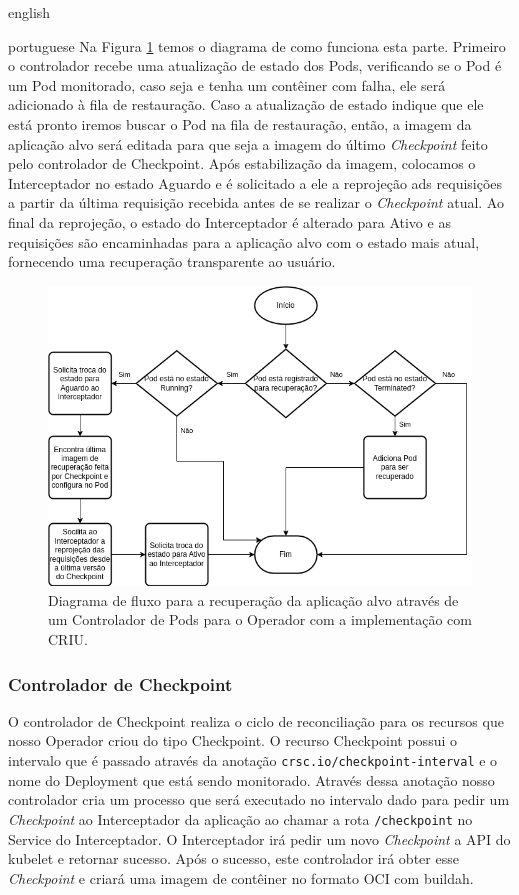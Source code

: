 \begin{otherlanguage*}{english}
\begin{otherlanguage*}{portuguese}
Na Figura \ref{fig:restore-pod} temos o diagrama de como funciona esta parte. Primeiro o
controlador recebe uma atualização de estado dos Pods, verificando se o Pod é um Pod monitorado,
caso seja e tenha um contêiner com falha, ele será adicionado à fila de restauração. Caso a
atualização de estado indique que ele está pronto iremos buscar o Pod na fila de restauração,
então, a imagem da aplicação alvo será editada para que seja a imagem do último \textit{Checkpoint}
feito pelo controlador de Checkpoint. Após estabilização da imagem, colocamos o Interceptador no
estado Aguardo e é solicitado a ele a reprojeção ads requisições a partir da última requisição
recebida antes de se realizar o \textit{Checkpoint} atual. Ao final da reprojeção, o estado do
Interceptador é alterado para Ativo e as requisições são encaminhadas para a aplicação alvo
com o estado mais atual, fornecendo uma recuperação transparente ao usuário.

\begin{figure}[h!]
\centering
\includegraphics[scale=0.64]{images/restore-pod-criu.png}
\caption{Diagrama de fluxo para a recuperação da aplicação alvo através de um Controlador de Pods para o Operador com a implementação com CRIU.}
\label{fig:restore-pod}
\end{figure}

\subsubsection{Controlador de Checkpoint}

O controlador de Checkpoint realiza o ciclo de reconciliação para os recursos que nosso
Operador criou do tipo Checkpoint. O recurso Checkpoint possui o intervalo que é
passado através da anotação \texttt{crsc.io/checkpoint-interval} e o nome do Deployment
que está sendo monitorado. Através dessa anotação nosso controlador cria um processo que
será executado no intervalo dado para pedir um \textit{Checkpoint} ao Interceptador da
aplicação ao chamar a rota \texttt{/checkpoint} no Service do Interceptador. O Interceptador
irá pedir um novo \textit{Checkpoint} a API do kubelet e retornar sucesso. Após o sucesso,
este controlador irá obter esse \textit{Checkpoint} e criará uma imagem de contêiner no
formato OCI com buildah.


\end{otherlanguage*}
\end{otherlanguage*}
